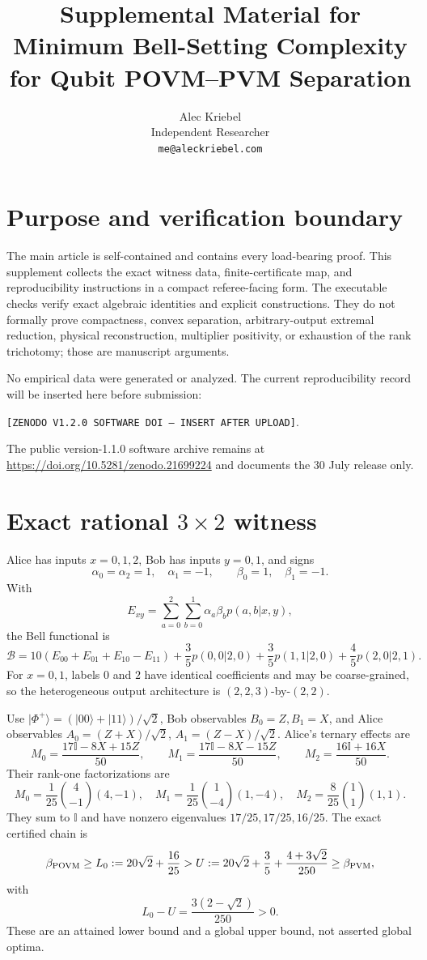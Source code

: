 \documentclass[10pt]{article}
\title{Supplemental Material for\\
\textbf{Minimum Bell-Setting Complexity for Qubit POVM--PVM Separation}}
\author{Alec Kriebel\\Independent Researcher\\
\texttt{me@aleckriebel.com}}
\date{}
\newcommand{\id}{\mathbb I}
\begin{document}
\maketitle

\section{Purpose and verification boundary}

The main article is self-contained and contains every load-bearing proof.
This supplement collects the exact witness data, finite-certificate map, and
reproducibility instructions in a compact referee-facing form. The executable
checks verify exact algebraic identities and explicit constructions. They do
not formally prove compactness, convex separation, arbitrary-output extremal
reduction, physical reconstruction, multiplier positivity, or exhaustion of
the rank trichotomy; those are manuscript arguments.

No empirical data were generated or analyzed. The current reproducibility
record will be inserted here before submission:
\begin{center}
\texttt{[ZENODO V1.2.0 SOFTWARE DOI --- INSERT AFTER UPLOAD]}.
\end{center}
The public version-1.1.0 software archive remains at
\url{https://doi.org/10.5281/zenodo.21699224} and documents the 30 July
release only.

\section{Exact rational \texorpdfstring{\(3\times2\)}{3-by-2} witness}

Alice has inputs \(x=0,1,2\), Bob has inputs \(y=0,1\), and signs
\[
\alpha_0=\alpha_2=1,\quad \alpha_1=-1,\qquad
\beta_0=1,\quad\beta_1=-1.
\]
With
\[
E_{xy}=\sum_{a=0}^2\sum_{b=0}^1
\alpha_a\beta_b p(a,b|x,y),
\]
the Bell functional is
\[
\mathcal B=10(E_{00}+E_{01}+E_{10}-E_{11})
+\frac35p(0,0|2,0)+\frac35p(1,1|2,0)
+\frac45p(2,0|2,1).
\]
For \(x=0,1\), labels \(0\) and \(2\) have identical coefficients and may
be coarse-grained, so the heterogeneous output architecture is
\((2,2,3)\)-by-\((2,2)\).

Use \(|\Phi^+\rangle=(|00\rangle+|11\rangle)/\sqrt2\), Bob observables
\(B_0=Z,B_1=X\), and Alice observables
\(A_0=(Z+X)/\sqrt2\), \(A_1=(Z-X)/\sqrt2\). Alice's ternary effects are
\[
M_0=\frac{17\id-8X+15Z}{50},\qquad
M_1=\frac{17\id-8X-15Z}{50},\qquad
M_2=\frac{16\id+16X}{50}.
\]
Their rank-one factorizations are
\[
M_0=\frac1{25}\binom4{-1}(4,-1),\quad
M_1=\frac1{25}\binom1{-4}(1,-4),\quad
M_2=\frac8{25}\binom11(1,1).
\]
They sum to \(\id\) and have nonzero eigenvalues
\(17/25,17/25,16/25\). The exact certified chain is
\[
\beta_{\rm POVM}\ge L_0:=20\sqrt2+\frac{16}{25}
>U:=20\sqrt2+\frac35+\frac{4+3\sqrt2}{250}
\ge\beta_{\rm PVM},
\]
with
\[
L_0-U=\frac{3(2-\sqrt2)}{250}>0.
\]
These are an attained lower bound and a global upper bound, not asserted
global optima.
\end{document}
